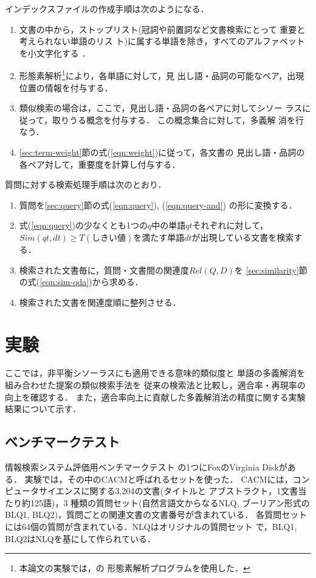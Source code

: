   インデックスファイルの作成手順は次のようになる．

\begin{enumerate}
 \renewcommand{\labelenumi}{}
 \item 文書の中から，ストップリスト(冠詞や前置詞など文書検索にとって
       重要と考えられない単語のリス
       ト)に属する単語を除き，すべてのアルファベットを小文字化する
       \cite{FoxC92}． 
 \item 形態素解析\footnote{本論文の実験では，\cite{Karp92}の
          形態素解析プログラムを使用した．}により，各単語に対して，見
        出し語・品詞の可能なペア，出現位置の情報を付与する．  
 \item 類似検索の場合は，ここで，見出し語・品詞の各ペアに対してシソー
   ラスに従って，取りうる概念を付与する． この概念集合に対して，多義解
   消を行なう．
 \item \ref{sec:term-weight}節の式(\ref{eqn:weight})に従って，各文書の
   見出し語・品詞の各ペア対して，重要度を計算し付与する．  
\end{enumerate}

  質問に対する検索処理手順は次のとおり．

\begin{enumerate}
 \item 質問を\ref{sec:query}節の式(\ref{eqn:query}), (\ref{eqn:query-and}) 
       の形に変換する． 
 \item 式(\ref{eqn:query})の少なくとも1つの$q$中の単語$qt$それぞれに対して，\\
       $Sim(qt,dt)\ge T(しきい値)$を満たす単語$dt$が出現している文書を検索する． 
 \item 検索された文書毎に，質問・文書間の関連度$Rel(Q, D)$を
       \ref{sec:similarity}節の式(\ref{eqn:sim-qda})から求める．
 \item 検索された文書を関連度順に整列させる．
\end{enumerate}


\section{実験}\label{sec:experiment}
ここでは，非平衡シソーラスにも適用できる意味的類似度と
単語の多義解消を組み合わせた提案の類似検索手法を
従来の検索法と比較し，適合率・再現率の向上を確認する．
また，適合率向上に貢献した多義解消法の精度に関する実験結果について示す．

\subsection{ベンチマークテスト}
  情報検索システム評価用ベンチマークテスト
  の1つにFoxのVirginia Disk\cite{FoxE90}がある．
  実験では，その中のCACMと呼ばれるセットを使った．
CACMには，コンピュータサイエンスに関する3,204の文書(タイトルと
アブストラクト，1文書当たり約125語)，3
種類の質問セット(自然言語文からなる{\small NLQ}, ブーリアン形式の{\small BLQ1,
BLQ2})，質問ごとの関連文書の文書番号が含まれている．
 各質問セットには64個の質問が含まれている．{\small NLQ}はオリジナルの質問セット
で，{\small BLQ1, BLQ2}は{\small NLQ}を基にして作られている．

